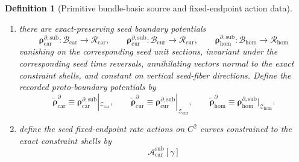 \documentclass[11pt]{article}
\newcommand{\HomDensityClass}{\mathscr N_{\mathrm{hom}}}
\newcommand{\TensorFluxClass}{\mathscr J_{\mathrm{car}}}
\newcommand{\CurFluxClass}{\mathscr J_{\mathrm{cur}}}
\newcommand{\HomFluxClass}{\mathscr J_{\mathrm{hom}}}
\newcommand{\TensorPhaseReadClass}{\mathscr R_{\mathrm{car}}}
\newcommand{\CurPhaseReadClass}{\mathscr R_{\mathrm{cur}}}
\newcommand{\HomPhaseReadClass}{\mathscr R_{\mathrm{hom}}}
\newcommand{\TensorProtoSpace}{\mathcal Z_{\mathrm{car}}}
\newcommand{\CurProtoSpace}{\mathcal Z_{\mathrm{cur}}}
\newcommand{\HomProtoSpace}{\mathcal Z_{\mathrm{hom}}}
\newcommand{\TensorProtoDensitySource}{\widetilde{\boldsymbol q}_{\mathrm{car}}}
\newcommand{\CurProtoDensitySource}{\widetilde{\boldsymbol q}_{\mathrm{cur}}}
\newcommand{\HomProtoDensitySource}{\widetilde{\boldsymbol q}_{\mathrm{hom}}}
\newcommand{\TensorProtoFluxSource}{\widetilde{\boldsymbol j}_{\mathrm{car}}}
\newcommand{\CurProtoFluxSource}{\widetilde{\boldsymbol j}_{\mathrm{cur}}}
\newcommand{\HomProtoFluxSource}{\widetilde{\boldsymbol j}_{\mathrm{hom}}}
\newcommand{\TensorProtoBoundarySource}{\widetilde{\boldsymbol{\rho}}_{\mathrm{car}}^{\partial}}
\newcommand{\CurProtoBoundarySource}{\widetilde{\boldsymbol{\rho}}_{\mathrm{cur}}^{\partial}}
\newcommand{\HomProtoBoundarySource}{\widetilde{\boldsymbol{\rho}}_{\mathrm{hom}}^{\partial}}
\newcommand{\TensorSeedSpace}{\mathcal B_{\mathrm{car}}}
\newcommand{\CurSeedSpace}{\mathcal B_{\mathrm{cur}}}
\newcommand{\HomSeedSpace}{\mathcal B_{\mathrm{hom}}}
\newcommand{\TensorSeedDensitySource}{\boldsymbol{q}_{\mathrm{car}}^{\mathrm{sub}}}
\newcommand{\CurSeedDensitySource}{\boldsymbol{q}_{\mathrm{cur}}^{\mathrm{sub}}}
\newcommand{\HomSeedDensitySource}{\boldsymbol{q}_{\mathrm{hom}}^{\mathrm{sub}}}
\newcommand{\TensorSeedFluxSource}{\boldsymbol{j}_{\mathrm{car}}^{\mathrm{sub}}}
\newcommand{\CurSeedFluxSource}{\boldsymbol{j}_{\mathrm{cur}}^{\mathrm{sub}}}
\newcommand{\HomSeedFluxSource}{\boldsymbol{j}_{\mathrm{hom}}^{\mathrm{sub}}}
\newcommand{\TensorSeedBoundarySource}{\boldsymbol{\rho}_{\mathrm{car}}^{\partial,\mathrm{sub}}}
\newcommand{\CurSeedBoundarySource}{\boldsymbol{\rho}_{\mathrm{cur}}^{\partial,\mathrm{sub}}}
\newcommand{\HomSeedBoundarySource}{\boldsymbol{\rho}_{\mathrm{hom}}^{\partial,\mathrm{sub}}}
\newcommand{\TensorSeedAction}{\mathscr A_{\mathrm{car}}^{\mathrm{sub}}}
\newtheorem{definition}{Definition}
\begin{document}
\begin{definition}[Primitive bundle-basic source and fixed-endpoint action data]
\begin{enumerate}
\[    \HomSeedDensitySource:\HomSeedSpace\to\HomDensityClass,
    \]
    \[
    \TensorSeedFluxSource:\TensorSeedSpace\to\TensorFluxClass,\qquad
    \CurSeedFluxSource:\CurSeedSpace\to\CurFluxClass,\qquad
    \HomSeedFluxSource:\HomSeedSpace\to\HomFluxClass,
    \]
    invariant under the corresponding seed time reversals, preserved along the corresponding characteristic flows on the exact constraint shells, and constant on normal constraint leaves and on vertical seed-fiber directions. Define the recorded proto-density and proto-flux source fields by restriction:
    \begin{equation}
    \TensorProtoDensitySource\equiv \TensorSeedDensitySource|_{\TensorProtoSpace},\qquad
    \CurProtoDensitySource\equiv \CurSeedDensitySource|_{\CurProtoSpace},\qquad
    \HomProtoDensitySource\equiv \HomSeedDensitySource|_{\HomProtoSpace},
    \label{eq:proto_density_from_seed}
    \end{equation}
    \begin{equation}
    \TensorProtoFluxSource\equiv \TensorSeedFluxSource|_{\TensorProtoSpace},\qquad
    \CurProtoFluxSource\equiv \CurSeedFluxSource|_{\CurProtoSpace},\qquad
    \HomProtoFluxSource\equiv \HomSeedFluxSource|_{\HomProtoSpace}.
    \label{eq:proto_flux_from_seed}
    \end{equation}
    \item there are exact-preserving seed boundary potentials
    \[
    \TensorSeedBoundarySource:\TensorSeedSpace\to\TensorPhaseReadClass,\qquad
    \CurSeedBoundarySource:\CurSeedSpace\to\CurPhaseReadClass,\qquad
    \HomSeedBoundarySource:\HomSeedSpace\to\HomPhaseReadClass
    \]
    vanishing on the corresponding seed unit sections, invariant under the corresponding seed time reversals, annihilating vectors normal to the exact constraint shells, and constant on vertical seed-fiber directions. Define the recorded proto-boundary potentials by
    \begin{equation}
    \TensorProtoBoundarySource\equiv \TensorSeedBoundarySource|_{\TensorProtoSpace},\qquad
    \CurProtoBoundarySource\equiv \CurSeedBoundarySource|_{\CurProtoSpace},\qquad
    \HomProtoBoundarySource\equiv \HomSeedBoundarySource|_{\HomProtoSpace}.
    \label{eq:proto_boundary_from_seed}
    \end{equation}
    \item define the seed fixed-endpoint rate actions on \(C^2\) curves constrained to the exact constraint shells by
    \begin{equation}
    \TensorSeedAction[\gamma]

\end{equation}
\end{enumerate}
\end{definition}
\end{document}
